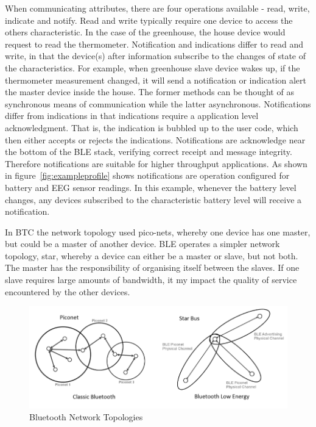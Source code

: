\documentclass[]{article}
\begin{document}
When communicating attributes, there are four operations available - read, write, indicate and notify. Read and write typically require one device to access the others characteristic. In the case of the greenhouse, the house device would request to read the thermometer. Notification and indications differ to read and write, in that the device(s) after information subscribe to the changes of state of the characteristics. For example, when greenhouse slave device wakes up, if the thermometer measurement changed, it will send a notification or indication alert the master device inside the house. The former methods can be thought of as synchronous means of communication while the latter asynchronous. Notifications differ from indications in that indications require a application level acknowledgment. That is, the indication is bubbled up to the user code, which then either accepts or rejects the indications. Notifications are acknowledge near the bottom of the \ac{BLE} stack, verifying correct receipt and message integrity. Therefore notifications are suitable for higher throughput applications. As shown in figure~\ref{fig:exampleprofile} shows notifications are operation configured for battery and EEG sensor readings. In this example, whenever the battery level changes, any devices subscribed to the characteristic battery level will receive a notification.

In \ac{BTC} the network topology used pico-nets, whereby one device has one master, but could be a master of another device. \ac{BLE} operates a simpler network topology, star, whereby a device can either be a master or slave, but not both. The master has the responsibility of organising itself between the slaves. If one slave requires large amounts of bandwidth, it my impact the quality of service encountered by the other devices. 

\begin{figure}[htb]
	\begin{center}
		\includegraphics[width = \textwidth]{topology}
	\end{center}
	\caption{Bluetooth Network Topologies }
	\label{fig:topology}
\end{figure}
\end{document}
